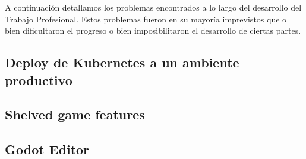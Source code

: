 
A continuación detallamos los problemas encontrados a lo largo del desarrollo del
Trabajo Profesional. Estos problemas fueron en su mayoría imprevistos que o bien
dificultaron el progreso o bien imposibilitaron el desarrollo de ciertas partes.

\subsection{Deploy de Kubernetes a un ambiente productivo}

\subsection{Shelved game features}

\subsection{Godot Editor}